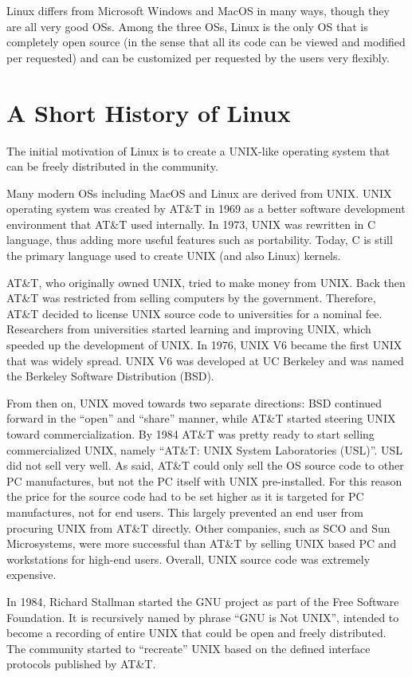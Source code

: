 Linux differs from Microsoft Windows and MacOS in many ways, though they are all very good OSs. Among the three OSs, Linux is the only OS that is completely open source (in the sense that all its code can be viewed and modified per requested) and can be customized per requested by the users very flexibly.

\section{A Short History of Linux}

The initial motivation of Linux is to create a UNIX-like operating system that can be freely distributed in the community. 

Many modern OSs including MacOS and Linux are derived from UNIX. UNIX operating system was created by AT\&T in 1969 as a better software development environment that AT\&T used internally. In 1973, UNIX was rewritten in C language, thus adding more useful features such as portability. Today, C is still the primary language used to create UNIX (and also Linux) kernels.

AT\&T, who originally owned UNIX, tried to make money from UNIX. Back then AT\&T was restricted from selling computers by the government. Therefore, AT\&T decided to license UNIX source code to universities for a nominal fee. Researchers from universities started learning and improving UNIX, which speeded up the development of UNIX. In 1976, UNIX V6 became the first UNIX that was widely spread. UNIX V6 was developed at UC Berkeley and was named the Berkeley Software Distribution (BSD).

From then on, UNIX moved towards two separate directions: BSD continued forward in the ``open'' and ``share'' manner, while AT\&T started steering UNIX toward commercialization. By 1984 AT\&T was pretty ready to start selling commercialized UNIX, namely ``AT\&T: UNIX System Laboratories (USL)''. USL did not sell very well. As said, AT\&T could only sell the OS source code to other PC manufactures, but not the PC itself with UNIX pre-installed. For this reason the price for the source code had to be set higher as it is targeted for PC manufactures, not for end users. This largely prevented an end user from procuring UNIX from AT\&T directly. Other companies, such as SCO and Sun Microsystems, were more successful than AT\&T by selling UNIX based PC and workstations for high-end users. Overall, UNIX source code was extremely expensive.

In 1984, Richard Stallman started the GNU project as part of the Free Software Foundation. It is recursively named by phrase ``GNU is Not UNIX'', intended to become a recording of entire UNIX that could be open and freely distributed. The community started to ``recreate'' UNIX based on the defined interface protocols published by AT\&T.

